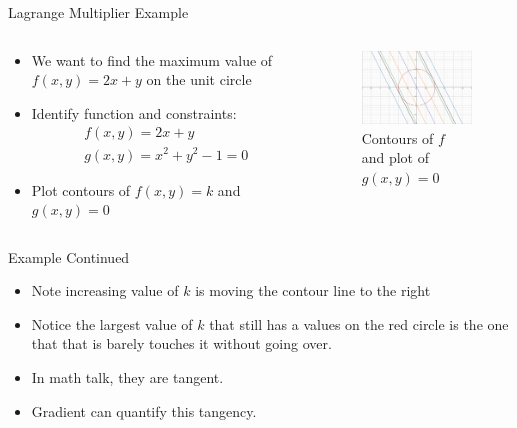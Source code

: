 \documentclass{beamer}
\begin{document}
\begin{frame}{Lagrange Multiplier Example}
  \begin{columns}
    \begin{column}{0.5\textwidth}
      \begin{itemize}
      \item We want to find the maximum value of $f(x,y)=2x+y$ on the unit circle
      \item Identify function and constraints:
        \begin{gather*}
          f(x,y)=2x+y\\
          g(x,y)=x^2+y^2-1=0
        \end{gather*}
      \item Plot contours of $f(x,y)=k$ and $g(x,y)=0$
      \end{itemize}
    \end{column}
    \begin{column}{0.5\textwidth}
      \begin{figure}[H]
        \centering
        \includegraphics[width=5.0cm]{gradient1.png}
        \caption{Contours of $f$ and plot of $g(x,y)=0$}
      \end{figure}
    \end{column}
  \end{columns}
\end{frame}
\begin{frame}{Example Continued}
  \begin{itemize}
  \item Note increasing value of $k$ is moving the contour line to the right
  \item Notice the largest value of $k$ that still has a values on the red circle is the one that that is barely touches it without going over.
  \item In math talk, they are tangent. 
  \item Gradient can quantify this tangency.
  \end{itemize}
\end{frame}
\end{document}
